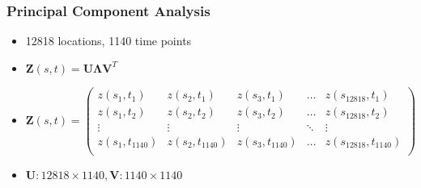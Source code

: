 \documentclass{beamer}
\begin{document}
\begin{frame}
\frametitle{Principal Component Analysis}
\begin{itemize}
\item 12818 locations, 1140 time points
\item $\mathbf{Z}(s,t) = \mathbf{U}\mathbf{\Lambda}\mathbf{V}^T$  
\item $\mathbf{Z}(s,t)  = \begin{pmatrix}
z(s_1, t_1) & z(s_2, t_1) & z(s_3, t_1) & \dots & z(s_{12818}, t_1) \\
z(s_1, t_2) & z(s_2, t_2) & z(s_3, t_2) & \dots & z(s_{12818}, t_2) \\
\vdots & \vdots & \vdots & \ddots & \vdots\\
z(s_1, t_{1140}) & z(s_2, t_{1140}) & z(s_3, t_{1140}) & \dots & z(s_{12818}, t_{1140})\\ 
\end{pmatrix}$
\item $\mathbf{U} : 12818 \times 1140,  \mathbf{V} : 1140 \times 1140$
\end{itemize}
\end{frame}
\end{document}
